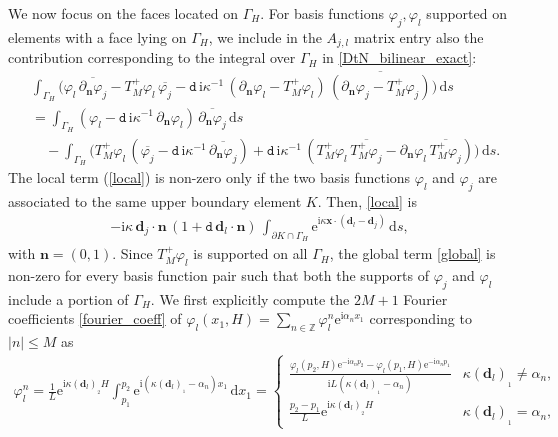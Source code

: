 \documentclass[a4paper,10pt]{article}
\newcommand{\IZ}{{\mathbb Z}}
\newcommand{\bx}{{\mathbf x}}
\newcommand{\bd}{{\mathbf d}}
\newcommand{\bn}{{\mathbf n}}
\newcommand{\ri}{{\mathrm i}}
\newcommand{\re}{{\mathrm e}}
\newcommand{\rd}{{\,\mathrm d}}
\newcommand{\pd}{{\mathtt{d}}}
\newcommand{\dn}{{\partial_\bn}}
\newcommand{\GH}{{\Gamma_H}}
\begin{document}
We now focus on the faces located on $\GH$. 
For basis functions $\varphi_j,\varphi_l$ supported on elements with a face lying on $\GH$, we include in the $A_{j,l}$ matrix entry also the contribution corresponding to the integral over $\GH$ in \eqref{DtN_bilinear_exact}:
\begin{align} \nonumber
& \int_\GH \biggl(  \varphi_l \, \overline{\dn \varphi_j}  
- T_M^+ \varphi_l \, \overline{\varphi_j}
- \pd \, \ri\kappa^{-1} \, \left(\dn \varphi_l -T_M^+ \varphi_l\right) \, \overline{\left(\dn \varphi_j -T_M^+ \varphi_j\right)} \biggl) \rd s 
\\ \label{local}
&=  \int_\GH  \left( \varphi_l -\pd \, \ri\kappa^{-1} \, \dn \varphi_l \right) \, \overline{\dn \varphi_j} \rd s \\ \label{global}
&\quad - \int_\GH \biggl( T_M^+ \varphi_l \, \left( \overline{\varphi_j} - \pd \, \ri\kappa^{-1} \, \overline{\dn \varphi_j} \right) + \pd \, \ri\kappa^{-1} \, \left( T_M^+ \varphi_l \, \overline{T_M^+ \varphi_j} - \dn \varphi_l \, \overline{T_M^+ \varphi_j} \right) \biggl) \rd s.
\end{align}
The local term (\ref{local}) is non-zero only if the two basis functions $\varphi_l$ and $\varphi_j$ are associated to the same upper boundary element $K$. 
Then, %
\eqref{local} is
\begin{align*}
-\ri\kappa \, \bd_j\cdot\bn \, (1 + \pd \, \bd_l\cdot\bn)\,
\int_{\partial K\cap\GH} \re^{\ri\kappa\bx\cdot(\bd_l-\bd_j)}\rd s,
\end{align*}
with $\bn=(0,1)$.
Since $T_M^+\varphi_l$ is supported on all $\GH$, the global term \eqref{global} is non-zero for every basis function pair such that both the supports of $\varphi_j$ and $\varphi_l$ include a portion of $\GH$.
We first explicitly compute the $2M+1$ Fourier coefficients \eqref{fourier_coeff} of 
$\varphi_l(x_1,H)=\sum_{n\in\IZ}\varphi_l^n\re^{\ri\alpha_nx_1}$ 
corresponding to $|n|\le M$ as
\begin{align*}
\varphi_l^n  
= \frac1L\re^{\ri\kappa(\bd_l)_{_2}H} \int_{p_1}^{p_2}\re^{\ri(\kappa (\bd_l)_{_1} -\alpha_n) x_1}\rd x_1
=\begin{cases}
	\frac{\varphi_l(p_2,H)\re^{-\ri\alpha_n p_2}-\varphi_l(p_1,H)\re^{-\ri\alpha_n p_1}}{\ri L(\kappa (\bd_l)_{_1} -\alpha_n)}
	& \kappa (\bd_l)_{_1}\ne\alpha_n,\\
	\frac{p_2-p_1}L\re^{\ri\kappa(\bd_l)_{_2}H}
	& \kappa (\bd_l)_{_1}=\alpha_n,
\end{cases}
\end{align*}
\end{document}

